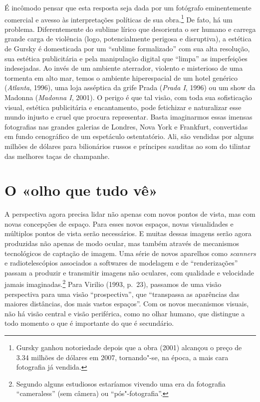 É incômodo pensar que esta resposta seja dada por um fotógrafo
eminentemente comercial e avesso às interpretações políticas de sua
obra.\footnote{Gursky ganhou notoriedade depois que a obra {} (2001) alcançou o preço de 3.34 milhões de dólares em
  2007, tornando"-se, na época, a mais cara fotografia já vendida.} De
fato, há um problema. Diferentemente do sublime lírico que desorienta o
ser humano e carrega grande carga de violência (logo, potencialmente
perigosa e disruptiva), a estética de Gursky é domesticada por um
``sublime formalizado'' com sua alta resolução, sua estética
publicitária e pela manipulação digital que ``limpa'' as imperfeições
indesejadas. Ao invés de um ambiente aterrador, violento e misterioso de
uma tormenta em alto mar, temos o ambiente hiperespacial de um hotel
genérico (\emph{Atlanta}, 1996), uma loja asséptica da grife Prada
(\emph{Prada I}, 1996) ou um show da Madonna (\emph{Madonna I}, 2001). O
perigo é que tal visão, com toda sua sofisticação visual, estética
publicitária e encantamento, pode fetichizar e naturalizar esse mundo
injusto e cruel que procura representar. Basta imaginarmos essas imensas
fotografias nas grandes galerias de Londres, Nova York e Frankfurt,
convertidas em fundo cenográfico de um espetáculo ostentatório. Ali, são
vendidas por alguns milhões de dólares para bilionários russos e
príncipes sauditas ao som do tilintar das melhores taças de champanhe.

\chapter{O «olho que tudo vê»}

A perspectiva agora precisa lidar não apenas com novos pontos de vista,
mas com novas concepções de espaço. Para esses novos espaços, novas
visualidades e múltiplos pontos de vista serão necessários. E muitas
dessas imagens serão agora produzidas não apenas de modo ocular, mas
também através de mecanismos tecnológicos de captação de imagem. Uma
série de novos aparelhos como \emph{scanners} e radiotelescópios associados a
softwares de modelagem  e de ``renderizações'' passam a produzir e
transmitir imagens não oculares, com qualidade e velocidade jamais
imaginadas.\footnote{Segundo alguns estudiosos estaríamos vivendo uma
  era da fotografia ``cameraless'' (sem câmera) ou
  ``pós"-fotografia''.} Para Virilio (1993, p.~23), passamos de uma visão
perspectiva para uma visão ``prospectiva'', que ``transpassa as
aparências das maiores distâncias, dos mais vastos espaços''. Com os
novos mecanismos visuais, não há visão central e visão periférica, como
no olhar humano, que distingue a todo momento o que é importante do que
é secundário.

